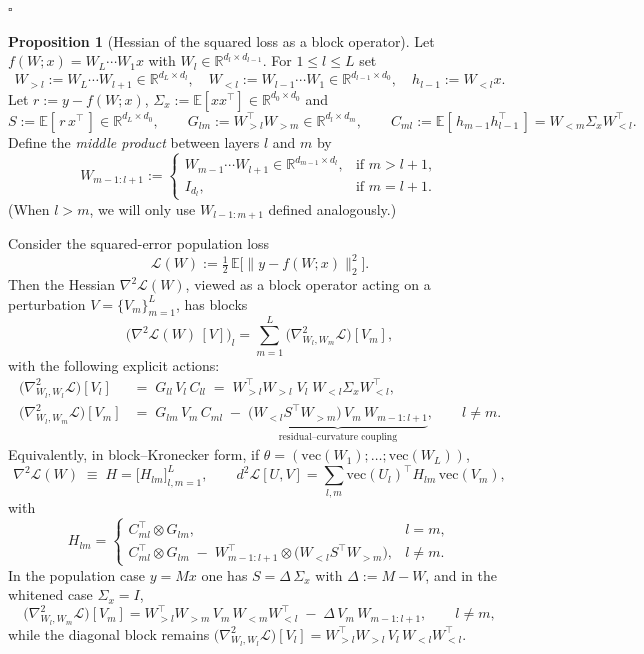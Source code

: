 \documentclass{article}
\theoremstyle{definition}
\newtheorem{proposition}[theorem]{Proposition}
\begin{document}
\hfill$\square$
\begin{proposition}[Hessian of the squared loss as a block operator]\label{prop:Hessian}
Let $f(W;x)=W_L\cdots W_1x$ with $W_l\in\mathbb{R}^{d_l\times d_{l-1}}$. For $1\le l\le L$ set
\[
W_{>l}:=W_L\cdots W_{l+1}\in\mathbb{R}^{d_L\times d_l},\quad
W_{<l}:=W_{l-1}\cdots W_{1}\in\mathbb{R}^{d_{l-1}\times d_0},\quad
h_{l-1}:=W_{<l}x.
\]
Let $r:=y-f(W;x)$, $\Sigma_x:=\mathbb{E}[xx^\top]\in\mathbb{R}^{d_0\times d_0}$ and
\[
S:=\mathbb{E}[\,r\,x^\top\,]\in\mathbb{R}^{d_L\times d_0},\qquad
G_{lm}:=W_{>l}^\top W_{>m}\in\mathbb{R}^{d_l\times d_m},\qquad
C_{ml}:=\mathbb{E}[\,h_{m-1}h_{l-1}^\top\,]=W_{<m}\Sigma_x W_{<l}^\top.
\]
Define the \emph{middle product} between layers $l$ and $m$ by
\[
W_{m-1:l+1}:=
\begin{cases}
W_{m-1}\cdots W_{l+1} \in \mathbb{R}^{d_{m-1}\times d_l}, & \text{if } m>l+1,\\
I_{d_l}, & \text{if } m=l+1.
\end{cases}
\]
(When $l>m$, we will only use $W_{l-1:m+1}$ defined analogously.)

Consider the squared-error population loss
\[
\mathcal L(W):=\tfrac12\,\mathbb{E}\big[\|y-f(W;x)\|_2^2\big].
\]
Then the Hessian $\nabla^2\mathcal L(W)$, viewed as a block operator acting on a perturbation
$V=\{V_m\}_{m=1}^L$, has blocks
\[
\big(\nabla^2\mathcal L(W)\,[V]\big)_l
= \sum_{m=1}^L \big(\nabla^2_{W_l,W_m}\mathcal L\big)[V_m],
\]
with the following explicit actions:
\[
\boxed{
\begin{aligned}
\big(\nabla^2_{W_l,W_l}\mathcal L\big)[V_l]
&= \;G_{ll}\,V_l\,C_{ll}
\;=\;W_{>l}^\top W_{>l}\;V_l\;W_{<l}\Sigma_x W_{<l}^\top,\\[3pt]
\big(\nabla^2_{W_l,W_m}\mathcal L\big)[V_m]
&= \;G_{lm}\,V_m\,C_{ml}
\;-\;\underbrace{\big(W_{<l}S^\top W_{>m}\big)\,V_m\,W_{m-1:l+1}}_{\text{residual--curvature coupling}},
\qquad l\neq m.
\end{aligned}}
\]
Equivalently, in block–Kronecker form, if $\theta=(\mathrm{vec}(W_1);\dots;\mathrm{vec}(W_L))$,
\[
\nabla^2\mathcal L(W) \;\equiv\; H=\big[H_{lm}\big]_{l,m=1}^L,\qquad
d^2\mathcal L[U,V]=\sum_{l,m}\mathrm{vec}(U_l)^\top H_{lm}\,\mathrm{vec}(V_m),
\]
with
\[
\boxed{
H_{lm}=
\begin{cases}
C_{ml}^\top\!\otimes G_{lm}, & l=m,\\[4pt]
C_{ml}^\top\!\otimes G_{lm}\;-\;W_{m-1:l+1}^\top \!\otimes\! \big(W_{<l}S^\top W_{>m}\big), & l\neq m.
\end{cases}}
\]
In the population case $y=Mx$ one has $S=\Delta\,\Sigma_x$ with $\Delta:=M-W$, and in the whitened case $\Sigma_x=I$,
\[
\big(\nabla^2_{W_l,W_m}\mathcal L\big)[V_m]
= W_{>l}^\top W_{>m}\,V_m\,W_{<m}W_{<l}^\top \;-\; \Delta\,V_m\,W_{m-1:l+1},
\qquad l\neq m,
\]
while the diagonal block remains $\big(\nabla^2_{W_l,W_l}\mathcal L\big)[V_l]=W_{>l}^\top W_{>l}\,V_l\,W_{<l}W_{<l}^\top$.
\end{proposition}
\end{document}
